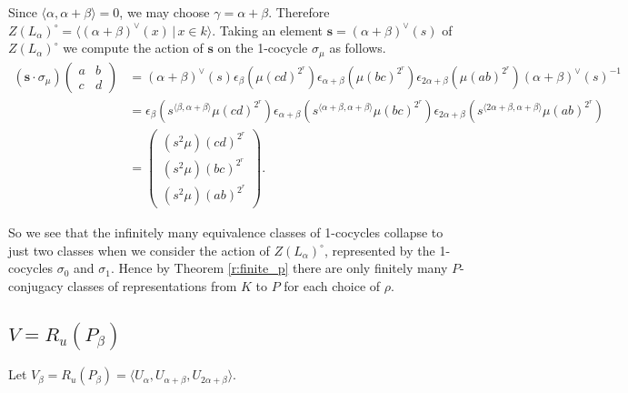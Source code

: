 Since $\langle \alpha, \alpha + \beta\rangle = 0$, we may choose $\gamma = \alpha + \beta$.
Therefore $Z(L_ \alpha)^\circ = \langle (\alpha + \beta)^\vee(x)\,|\,x \in k \rangle$. Taking an element $\mathbf{s} = (\alpha + \beta)^\vee(s)$ of $Z(L_\alpha)^\circ$ we compute the action of $\mathbf{s}$ on the 1-cocycle $\sigma_\mu$ as follows.
\begin{align*}
\left(\mathbf{s}\cdot \sigma_\mu\right)
\left(\begin{matrix} a & b \\ c & d\end{matrix} \right) 
&=
(\alpha + \beta)^\vee(s) \epsilon_\beta \left(\mu (cd)^{2^r} \right)\epsilon_{\alpha+\beta} \left(\mu(bc)^{2^r} \right)\epsilon_{2\alpha + \beta} \left(\mu(ab)^{2^r} \right)(\alpha + \beta)^\vee(s)^{-1}\\
&=  \epsilon_\beta\left(s^{\langle\beta , \alpha+\beta\rangle}\mu (cd)^{2^r} \right)\epsilon_{\alpha+\beta} \left(s^{\langle \alpha+\beta, \alpha+\beta \rangle} \mu(bc)^{2^r} \right)\epsilon_{2\alpha + \beta} \left(s^{\langle 2\alpha+\beta, \alpha+\beta\rangle}\mu(ab)^{2^r}\right) \\
&=
\left(\begin{matrix}
(s^2\mu)(cd)^{2^r} \\
(s^2\mu)(bc)^{2^r} \\
(s^2\mu)(ab)^{2^r}
\end{matrix}\right).
\end{align*}

So we see that the infinitely many equivalence classes of 1-cocycles collapse to just two classes when we consider the action of $Z(L_\alpha)^\circ$, represented by the 1-cocycles $\sigma_0$ and $\sigma_1$. Hence by Theorem \ref{r:finite_p} there are only finitely many $P$-conjugacy classes of representations from $K$ to $P$ for each choice of $\rho$.

\subsection{$V = R_u(P_\beta)$}
\label{b2:beta}

Let $V_\beta = R_u(P_\beta) = \langle U_\alpha, U_{\alpha + \beta}, U_{2\alpha + \beta} \rangle$.

